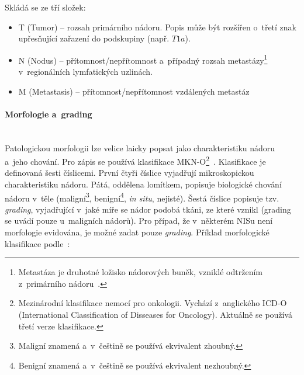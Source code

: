 \documentclass[11pt, draft, oneside]{fithesis2}
\newcommand{\paragraphNewLine}[1]{\paragraph*{#1}\mbox{}\\}
\begin{document}
Skládá se ze tří složek:
\begin{itemize}
	\item T (Tumor) -- rozsah primárního nádoru. Popis může být rozšířen o~třetí znak upřesňující zařazení do podskupiny (např. $T1a$).
	
	\item N (Nodus) -- přítomnost/nepřítomnost a~případný rozsah metastázy\footnote{Metastáza je druhotné ložisko nádorových buněk, vzniklé odtržením z~primárního nádoru~\cite{metastaza}.} v~regionálních lymfatických uzlinách.
	\item M (Metastasis) -- přítomnost/nepřítomnost vzdálených metastáz
\end{itemize}

\paragraphNewLine{Morfologie a~grading}
Patologickou morfologii lze velice laicky popsat jako charakteristiku nádoru a~jeho chování. Pro zápis se používá klasifikace MKN-O\footnote{Mezinárodní klasifikace nemocí pro onkologii. Vychází z~anglického ICD-O (International Classification of Disseases for Oncology). Aktuálně se používá třetí verze klasifikace.}~\cite{MKN-O}. Klasifikace je definovaná šesti číslicemi. První čtyři číslice vyjadřují mikroskopickou charakteristiku nádoru. Pátá, oddělena lomítkem, popisuje biologické chování nádoru v~těle (maligní\footnote{Maligní znamená  a~v~češtině se používá ekvivalent zhoubný.}, benigní\footnote{Benigní znamená  a~v~češtině se používá ekvivalent nezhoubný.}, \textit{in situ}, nejisté). Šestá číslice popisuje tzv. \textit{grading}, vyjadřující v~jaké míře se nádor podobá tkáni, ze které vznikl (grading se uvádí pouze u~maligních nádorů). Pro případ, že v~některém NISu není morfologie evidována, je možné zadat pouze \textit{grading}.
Příklad morfologické klasifikace podle~\cite{MKN-O}:
\end{document}
